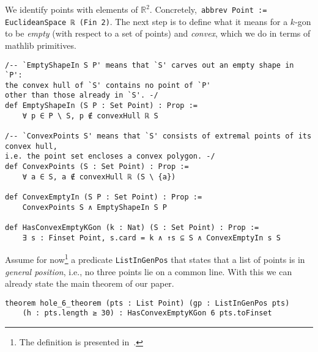 We identify points with elements of $\mathbb{R}^2$. Concretely,~\lstinline|abbrev Point := EuclideanSpace ℝ (Fin 2)|.
The next step is to define what it means for a $k$-gon to be \emph{empty} (with respect to a set of points) and \emph{convex}, which we do in terms of \textsf{mathlib} primitives.

\begin{lstlisting}
/-- `EmptyShapeIn S P' means that `S' carves out an empty shape in `P':
the convex hull of `S' contains no point of `P'
other than those already in `S'. -/
def EmptyShapeIn (S P : Set Point) : Prop :=
    ∀ p ∈ P \ S, p ∉ convexHull ℝ S

/-- `ConvexPoints S' means that `S' consists of extremal points of its convex hull,
i.e. the point set encloses a convex polygon. -/
def ConvexPoints (S : Set Point) : Prop :=
    ∀ a ∈ S, a ∉ convexHull ℝ (S \ {a})

def ConvexEmptyIn (S P : Set Point) : Prop :=
    ConvexPoints S ∧ EmptyShapeIn S P

def HasConvexEmptyKGon (k : Nat) (S : Set Point) : Prop :=
    ∃ s : Finset Point, s.card = k ∧ ↑s ⊆ S ∧ ConvexEmptyIn s S
\end{lstlisting}

Assume for now\footnote{The definition is presented in~.} a predicate \lstinline|ListInGenPos| that states that a list of points is in \emph{general position}, i.e., no three points lie on a common line.
With this we can already state the main theorem of our paper.

\begin{lstlisting}
theorem hole_6_theorem (pts : List Point) (gp : ListInGenPos pts)
    (h : pts.length ≥ 30) : HasConvexEmptyKGon 6 pts.toFinset
\end{lstlisting}

